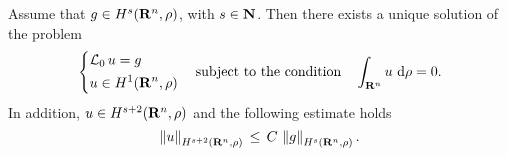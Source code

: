\begin{lemma}
    Assume that $g \in H^{s}(\mathbf R^n, \rho)$,
    with $s\in \mathbf N$. Then there exists a unique solution of the problem
    $$
    \left\{ 
        \begin{aligned}
            &\mathcal L_0 \, u = g   \\
            &u \in H^{1}(\mathbf R^n, \rho)  
        \end{aligned} 
    \right .
    \quad \text{subject to the condition} \quad \int_{\mathbf R^n} u \, \,\mathrm d \rho = 0.
    $$
    In addition, $u \in H^{s+2}(\mathbf R^n, \rho)$ and the following estimate holds
    $$
        \left\| u \right\|_{H^{s+2}(\mathbf R^n, \rho)} \,\leq\, C \, \left\| g \right\|_{H^{s}(\mathbf R^n, \rho)}.
    $$
    \label{lemma: regularity of the solution of the cell problem}
\end{lemma}
